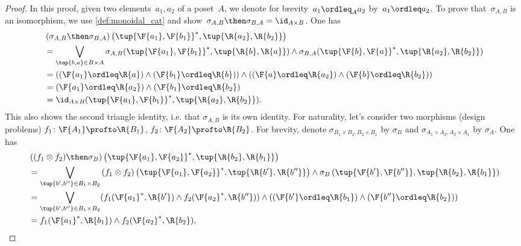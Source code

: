 \begin{proof}
In this proof, given two elements~$a_1,a_2$ of a poset~$A$, we denote for brevity~$a_1 \ordleq_A a_2$ by~$a_1 \ordleq a_2$.
To prove that~$\sigma_{A,B}$ is an isomorphism, we use \cref{def:monoidal_cat} and show~$\sigma_{A,B}\then \sigma_{B,A}=\id_{A\times B}$. One has
    \begin{equation}
        \begin{aligned}
           &\left( \sigma_{A,B}\then \sigma_{B,A}\right) \left( \tup{\F{a_1},\F{b_1}}^*,\tup{\R{a_2},\R{b_2}}\right)\\
           &=\bigvee_{\tup{b,a}\in B\times A}\sigma_{A,B}(\tup{\F{a_1},\F{b_1}}^*,\tup{\R{b},\R{a}})\wedge \sigma_{B,A}(\tup{\F{b},\F{a}}^*,\tup{\R{a_2},\R{b_2}})\\
           &=\left( (\F{a_1}\ordleq \R{a}) \wedge (\F{b_1}\ordleq \R{b})\right)\wedge \left((\F{a}\ordleq \R{a_2}) \wedge (\F{b}\ordleq \R{b_2})\right)\\
           &=(\F{a_1}\ordleq \R{a_2})\wedge (\F{b_1}\ordleq \R{b_2})\\
           &=\id_{A\times B}(\tup{\F{a_1},\F{b_1}}^*,\tup{\R{a_2},\R{b_2}}).
        \end{aligned}
    \end{equation}
    This also shows the second triangle identity, i.e. that $\sigma_{A,B}$ is its own identity.
    For naturality, let's consider two morphisms (design problems) $f_1\colon \F{A_1}\profto \R{B_1}$, $f_2\colon \F{A_2}\profto \R{B_2}$. For brevity, denote $\sigma_{B_1\times B_2,B_2\times B_1}$ by $\sigma_B$ and $\sigma_{A_1\times A_2,A_2\times A_1}$ by $\sigma_A$. One has
    \begin{equation}
        \begin{aligned}
           &\left((f_1\otimes f_2)\then \sigma_B \right)\left( \tup{\F{a_1},\F{a_2}}^*,\tup{\R{b_2},\R{b_1}}\right)\\
           &=\bigvee_{\tup{b',b''}\in B_1\times B_2} \left(f_1\otimes f_2\right) \left( \tup{\F{a_1},\F{a_2}}^*,\tup{\R{b'},\R{b''}}\right)\wedge \sigma_B\left(\tup{\F{b'},\F{b''}},\tup{\R{b_2},\R{b_1}} \right)\\
           &=\bigvee_{\tup{b',b''}\in B_1\times B_2}(f_1(\F{a_1}^*,\R{b'})\wedge f_2(\F{a_2}^*,\R{b''}))\wedge (\left(\F{b'}\ordleq \R{b_1}\right) \wedge \left(\F{b''}\ordleq \R{b_2}\right))\\
           &= f_1(\F{a_1}^*,\R{b_1}) \wedge f_2(\F{a_2}^*,\R{b_2}),
        \end{aligned}
    \end{equation}

\end{proof}
